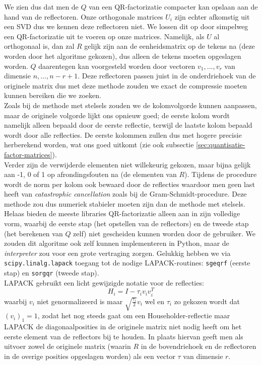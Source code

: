 We zien dus dat men de $Q$ van een QR-factorizatie compacter kan opslaan aan de hand van de reflectoren. Onze orthogonale matrices $U_i$ zijn echter afkomstig uit een SVD dus we kennen deze reflectoren niet. We lossen dit op door simpelweg een QR-factorizatie uit te voeren op onze matrices. Namelijk, als $U$ al orthogonaal is, dan zal $R$ gelijk zijn aan de eenheidsmatrix op de tekens na (deze worden door het algoritme gekozen), dus alleen de tekens moeten opgeslagen worden. $Q$ daarentegen kan voorgesteld worden door vectoren $v_1, \dots, v_r$ van dimensie $n, \dots, n - r + 1$. Deze reflectoren passen juist in de onderdriehoek van de originele matrix dus met deze methode zouden we exact de compressie moeten kunnen bereiken die we zoeken.\\

Zoals bij de methode met stelsels zouden we de kolomvolgorde kunnen aanpassen, maar de originele volgorde lijkt ons opnieuw goed; de eerste kolom wordt namelijk alleen bepaald door de eerste reflectie, terwijl de laatste kolom bepaald wordt door alle reflecties. De eerste kolommen zullen dus met hogere precisie herberekend worden, wat ons goed uitkomt (zie ook subsectie \ref{sec:quantisatie-factor-matrices}).\\

Verder zijn de verwijderde elementen niet willekeurig gekozen, maar bijna gelijk aan -1, 0 of 1 op afrondingsfouten na (de elementen van $R$). Tijdens de procedure wordt de norm per kolom ook bewaard door de reflecties waardoor men geen last heeft van \textit{catastrophic cancellation} zoals bij de Gram-Schmidt-procedure. Deze methode zou dus numeriek stabieler moeten zijn dan de methode met stelsels.\\

Helaas bieden de meeste libraries QR-factorizatie alleen aan in zijn volledige vorm, waarbij de eerste stap (het opstellen van de reflectors) en de tweede stap (het berekenen van $Q$ zelf) niet gescheiden kunnen worden door de gebruiker. We zouden dit algoritme ook zelf kunnen implementeren in Python, maar de \textit{interpreter} zou voor een grote vertraging zorgen. Gelukkig hebben we via \texttt{scipy.linalg.lapack} toegang tot de nodige LAPACK-routines: \texttt{sgeqrf} (eerste stap) en \texttt{sorgqr} (tweede stap).\\

LAPACK gebruikt een licht gewijzigde notatie voor de reflecties:
\[
H_i = I - \tau_i v_i v_i^T
\]
waarbij $v_i$ niet genormalizeerd is maar $\sqrt{\frac{\tau_i}{2}} v_i$ wel en $\tau_i$ zo gekozen wordt dat $(v_i)_1 = 1$, zodat het nog steeds gaat om een Householder-reflectie maar LAPACK de diagonaalposities in de originele matrix niet nodig heeft om het eerste element van de reflectors bij te houden. In plaats hiervan geeft men als uitvoer zowel de originele matrix (waarin $R$ in de bovendriehoek en de reflectoren in de overige posities opgeslagen worden) als een vector $\tau$ van dimensie $r$.\\

